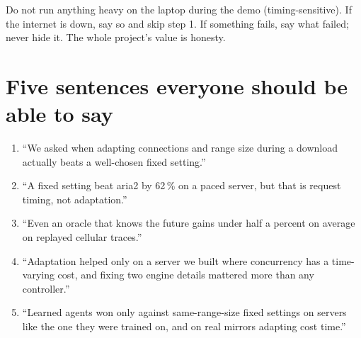 \begin{vivatip}
Do not run anything heavy on the laptop during the demo (timing-sensitive). If the internet is down, say so and skip step 1. If something fails, say what failed; never hide it. The whole project's value is honesty.
\end{vivatip}

\section{Five sentences everyone should be able to say}
\begin{enumerate}
\item ``We asked when adapting connections and range size during a download actually beats a well-chosen fixed setting.''
\item ``A fixed setting beat aria2 by 62\,\% on a paced server, but that is request timing, not adaptation.''
\item ``Even an oracle that knows the future gains under half a percent on average on replayed cellular traces.''
\item ``Adaptation helped only on a server we built where concurrency has a time-varying cost, and fixing two engine details mattered more than any controller.''
\item ``Learned agents won only against same-range-size fixed settings on servers like the one they were trained on, and on real mirrors adapting cost time.''
\end{enumerate}

